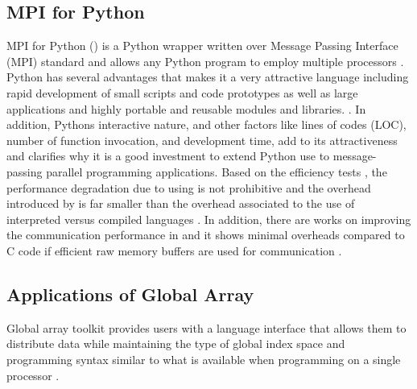 \subsection{MPI for Python }
MPI for Python () is a Python wrapper written over Message Passing Interface (MPI) standard and allows any Python program to employ multiple processors \cite{Dalcin:2011aa, Dalcin:2005aa}.
Python has several advantages that makes it a very attractive language including rapid development of small scripts and code prototypes as well as large applications and highly portable and reusable modules and libraries.
. 
In addition, Python\textsc{}s interactive nature, and other factors like lines of codes (LOC), number of function invocation, and development time, add to its attractiveness and clarifies why it is a good investment to extend Python use to message-passing parallel programming applications.
Based on the efficiency tests \cite{Dalcin:2011aa, Dalcin:2005aa}, the performance degradation due to using  is not prohibitive and the overhead introduced by  is far smaller than the overhead associated to the use of interpreted versus compiled languages \cite{GAiN}.
In addition, there are works on improving the communication performance in  and it shows minimal overheads compared to C code if efficient raw memory buffers are used for communication \cite{Dalcin:2011aa}.

\subsection{Applications of Global Array}
Global array toolkit provides users with a language interface that allows them to distribute data while maintaining the type of global index space and programming syntax similar to what is available when programming on a single processor \cite{GA}.

